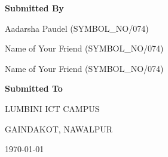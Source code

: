 \begin{titlepage}
\begin{centering}
    \vspace{10pt}

\begin{spacing}{1.3}
\textbf{Submitted By}


Aadarsha Paudel (SYMBOL_NO/074)

Name of Your Friend (SYMBOL_NO/074)

Name of Your Friend (SYMBOL_NO/074)


\end{spacing}

\vspace{10pt}

\begin{spacing}{1.3}
    
    \textbf{Submitted To}

    LUMBINI ICT CAMPUS


    GAINDAKOT, NAWALPUR 

\end{spacing}
\vspace{10pt}


\today

\end{centering}
\thispagestyle{empty}
\vspace*{\fill}
\end{titlepage}
